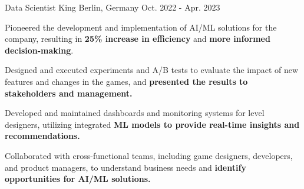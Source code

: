

\begin{cventries}
  \cventry
    {Data Scientist} %
    {King} %
    {Berlin, Germany} %
    {Oct. 2022 - Apr. 2023} %
    {
      \begin{cvitems} %
        \item {Pioneered the development and implementation of AI/ML solutions for the company, resulting in \textbf{25\% increase in efficiency} and \textbf{more informed decision-making}.}
        \item {Designed and executed experiments and A/B tests to evaluate the impact of new features and changes in the games, and \textbf{presented the results to stakeholders and management.}}
        \item {Developed and maintained dashboards and monitoring systems for level designers, utilizing integrated \textbf{ML models to provide real-time insights and recommendations.}}
        \item {Collaborated with cross-functional teams, including game designers, developers, and product managers, to understand business needs and \textbf{identify opportunities for AI/ML solutions.}}
      \end{cvitems}
    }



\end{cventries}
